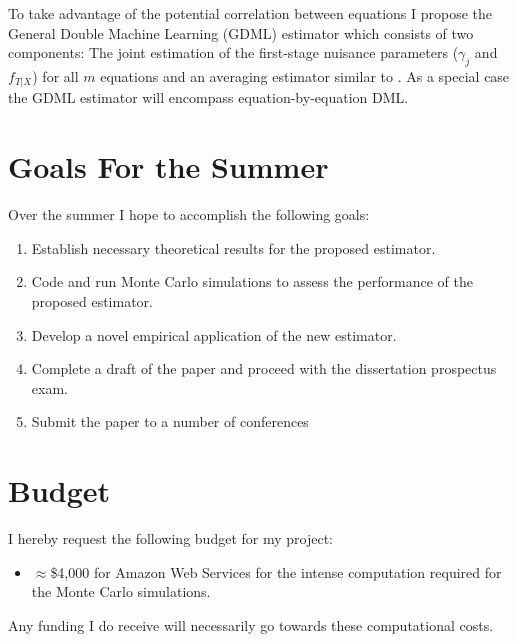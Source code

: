 \documentclass[12pt]{article}
\begin{document}
To take advantage of the potential correlation between equations I propose the General Double Machine Learning (GDML) estimator which consists of two components: The joint estimation of the first-stage nuisance parameters ($\gamma_j$ and $f_{T|X}$) for all $m$ equations  and an averaging estimator similar to \cite{mehrabani2020improved}. As a special case the GDML estimator will encompass equation-by-equation DML. 
 
\newpage
\section{Goals For the Summer}
Over the summer I hope to accomplish the following goals:
\begin{enumerate}
	\item Establish necessary theoretical results for the proposed estimator.
	\item Code and run Monte Carlo simulations to assess the performance of the proposed estimator.
	\item Develop a novel empirical application of the new estimator.
	\item Complete a draft of the paper and proceed with the dissertation prospectus exam. 
	\item Submit the paper to a number of conferences
\end{enumerate}
\section{Budget}
I hereby request the following budget for my project:
\begin{itemize}
	\item $\approx$\$4,000 for Amazon Web Services for the intense computation required for the Monte Carlo simulations.
\end{itemize}
Any funding I do receive will necessarily go towards these computational costs.




\newpage
\end{document}

